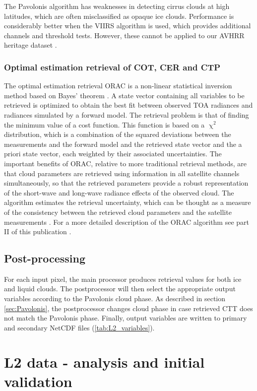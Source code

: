 The Pavolonis algorithm has weaknesses in detecting cirrus clouds at high latitudes, which are often misclassified as opaque ice clouds. Performance is considerably better when the VIIRS algorithm is used, which provides additional channels and threshold tests. However, these cannot be applied to our AVHRR heritage dataset \citep{Pavolonis05}.

\subsubsection{Optimal estimation retrieval of COT, CER and CTP}
The optimal estimation retrieval ORAC is a non-linear statistical inversion method based on Bayes' theorem \citep{Rodgers09}. A state vector containing all variables to be retrieved is optimized to obtain the best fit between observed TOA radiances and radiances simulated by a forward model. The retrieval problem is that of finding the minimum value of a cost function. This function is based on a $\upchi^2$ distribution, which is a combination of the squared deviations between the measurements and the forward model and the retrieved state vector and the a priori state vector, each weighted by their associated uncertainties. The important benefits of ORAC, relative to more traditional retrieval methods, are that cloud parameters are retrieved using information in all satellite channels simultaneously, so that the retrieved parameters provide a robust representation of the short-wave and long-wave radiance effects of the observed cloud. The algorithm estimates the retrieval uncertainty, which can be thought as a measure of the consistency between the retrieved cloud parameters and the satellite measurements \citep{Poulsen12}. For a more detailed description of the ORAC algorithm see part II of this publication \citep{GregPart2}.
\subsection{Post-processing}

For each input pixel, the main processor produces retrieval values for both ice and liquid clouds. The postprocessor will then select the appropriate output variables according to the Pavolonis cloud phase. As described in section \ref{sec:Pavolonis}, the postprocessor changes cloud phase in case retrieved CTT does not match the Pavolonis phase. Finally, output variables are written to primary and secondary NetCDF files (\cref{tab:L2_variables}).

\section{L2 data - analysis and initial validation}\label{L2_data}

